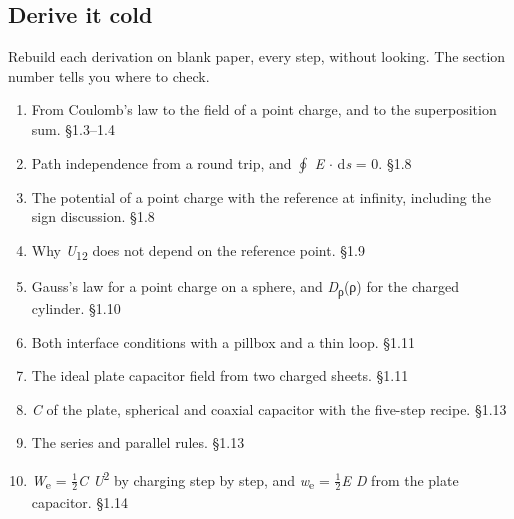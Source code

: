 \documentclass[11pt]{article}
\begin{document}
\begin{keepsection}
\section{Derive it cold}

Rebuild each derivation on blank paper, every step, without looking. The section number tells you where to check.

\begin{enumerate}
\item From Coulomb’s law to the field of a point charge, and to the superposition sum. \hfill{\small\color{FAUblue}§1.3–1.4}
\item Path independence from a round trip, and $\oint $ \textit{E} \ensuremath{\cdot} d\textit{s} = 0. \hfill{\small\color{FAUblue}§1.8}
\item The potential of a point charge with the reference at infinity, including the sign discussion. \hfill{\small\color{FAUblue}§1.8}
\item Why \textit{U}\textsubscript{12} does not depend on the reference point. \hfill{\small\color{FAUblue}§1.9}
\item Gauss’s law for a point charge on a sphere, and \textit{D}\textsubscript{ρ}(ρ) for the charged cylinder. \hfill{\small\color{FAUblue}§1.10}
\item Both interface conditions with a pillbox and a thin loop. \hfill{\small\color{FAUblue}§1.11}
\item The ideal plate capacitor field from two charged sheets. \hfill{\small\color{FAUblue}§1.11}
\item \textit{C} of the plate, spherical and coaxial capacitor with the five-step recipe. \hfill{\small\color{FAUblue}§1.13}
\item The series and parallel rules. \hfill{\small\color{FAUblue}§1.13}
\item \textit{W}\textsubscript{e} = \ensuremath{\tfrac12}\textit{C U}\textsuperscript{2} by charging step by step, and \textit{w}\textsubscript{e} = \ensuremath{\tfrac12}\textit{E D} from the plate capacitor. \hfill{\small\color{FAUblue}§1.14}
\end{enumerate}
\end{keepsection}
\end{document}

